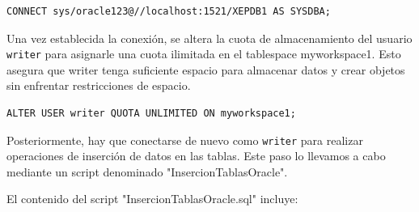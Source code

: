 \documentclass{article}
\begin{document}
\begin{lstlisting}[style=bashStyle]
CONNECT sys/oracle123@//localhost:1521/XEPDB1 AS SYSDBA;
\end{lstlisting}

Una vez establecida la conexión, se altera la cuota de almacenamiento del usuario \texttt{writer} para asignarle una cuota ilimitada en el tablespace myworkspace1. Esto asegura que writer tenga suficiente espacio para almacenar datos y crear objetos sin enfrentar restricciones de espacio.

\begin{lstlisting}[style=bashStyle]
ALTER USER writer QUOTA UNLIMITED ON myworkspace1;
\end{lstlisting}

Posteriormente, hay que conectarse de nuevo como \texttt{writer} para realizar operaciones de inserción de datos en las tablas. Este paso lo llevamos a cabo mediante un script denominado "InsercionTablasOracle". 

El contenido del script "InsercionTablasOracle.sql" incluye:
\end{document}

